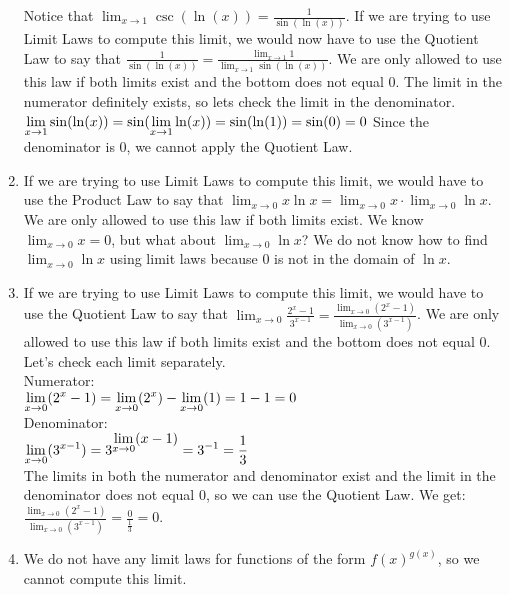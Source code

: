 \documentclass{ximera}
\begin{document}
\begin{question}
\begin{feedback}
\begin{enumerate}
   Notice that $\lim_{x\to 1}\csc(\ln(x)) = \frac{1}{\sin(\ln(x))}$.  If we are trying to use Limit Laws to compute this limit, we would now have to use the Quotient Law to say that $\frac{1}{\sin(\ln(x))}
   = \frac{\lim_{x\to 1}1}{\lim_{x\to 1}\sin(\ln(x))}$.  We are only allowed to use this law if both limits exist and the bottom does not equal 0.  The limit in the numerator definitely exists, so lets check the limit in the denominator.\\
    $\lim_{x\to 1}\sin(\ln(x)) \\
    = \sin(\lim_{x\to 1}\ln(x))\\
    = \sin(\ln(1))\\
    = \sin(0) = 0\\$
   Since the denominator is 0, we cannot apply the Quotient Law.  
     
   \item If we are trying to use Limit Laws to compute this limit, we would have to use the Product Law to say that $\lim_{x\to 0} x\ln x = \lim_{x\to 0} x \cdot \lim_{x\to 0}\ln x$.  We are only allowed to use this law if both limits exist.  We know $\lim_{x\to 0} x = 0$, but what about $\lim_{x\to 0}\ln x$?
   We do not know how to find $\lim_{x\to 0}\ln x$ using limit laws because 0 is not in the domain of $\ln x$.
   
   \item If we are trying to use Limit Laws to compute this limit, we would have to use the Quotient Law to say that $\lim_{x\to 0}\frac{2^x-1}{3^{x-1}}
   = \frac{\lim_{x\to 0}(2^x-1)}{\lim_{x\to 0}(3^{x-1})}$.  We are only allowed to use this law if both limits exist and the bottom does not equal 0.   Let's check each limit separately.\\
   Numerator:\\
   $\lim_{x\to 0}(2^x-1)\\
   =\lim_{x\to 0}(2^x)-\lim_{x\to 0}(1)\\
   =1-1=0$\\
   Denominator:\\
   $\lim_{x\to 0}(3^{x-1})\\
   =3^{\lim_{x\to 0}(x-1)}\\
   =3^{-1}=\frac{1}{3}$\\
   The limits in both the numerator and denominator exist and the limit in the denominator does not equal 0, so we can use the Quotient Law.  We get:\\
   $\frac{\lim_{x\to 0}(2^x-1)}{\lim_{x\to 0}(3^{x-1})}
   =\frac{0}{\frac{1}{3}}=0$.
   


   
   \item We do not have any limit laws for functions of the form $f(x)^{g(x)}$, so we cannot compute this limit.
    \end{enumerate}
    \end{feedback} 
    
\end{question}
\end{document}
